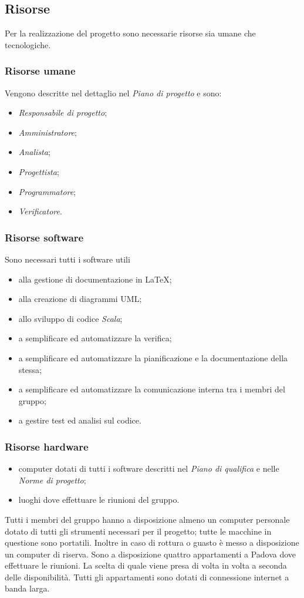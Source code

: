 \documentclass[a4paper]{article}
\begin{document}
		\subsection{Risorse}
			Per la realizzazione del progetto sono necessarie risorse sia umane che tecnologiche.
			\subsubsection{Risorse umane}
				Vengono descritte nel dettaglio nel \emph{Piano di progetto} e sono:
				\begin{itemize}
					\item \emph{Responsabile di progetto};
					\item \emph{Amministratore};
					\item \emph{Analista};
					\item \emph{Progettista};
					\item \emph{Programmatore};
					\item \emph{Verificatore}.
				\end{itemize}
			\subsubsection{Risorse software}
				Sono necessari tutti i software utili
				\begin{itemize}
					\item alla gestione di documentazione in \LaTeX;
					\item alla creazione di diagrammi UML;
					\item allo sviluppo di codice \emph{Scala};
					\item a semplificare ed automatizzare la verifica;
					\item a semplificare ed automatizzare la pianificazione e la documentazione della stessa;
					\item a semplificare ed automatizzare la comunicazione interna tra i membri del gruppo;
					\item a gestire test ed analisi sul codice.
				\end{itemize}
				\subsubsection{Risorse hardware}
					\begin{itemize}
						\item computer dotati di tutti i software descritti nel \emph{Piano di qualifica} e nelle
						\emph{Norme di progetto};
						\item luoghi dove effettuare le riunioni del gruppo.
					\end{itemize}
				Tutti i membri del gruppo hanno a disposizione almeno un computer personale dotato di tutti gli strumenti
				necessari per il progetto; tutte le macchine in questione sono portatili. Inoltre in caso di rottura o guasto
				è messo a disposizione un computer di riserva. Sono a disposizione quattro appartamenti a Padova dove
				effettuare le riunioni. La scelta di quale viene presa di volta in volta a seconda delle disponibilità. Tutti
				gli appartamenti sono dotati di connessione internet a banda larga.				
				
\end{document}
